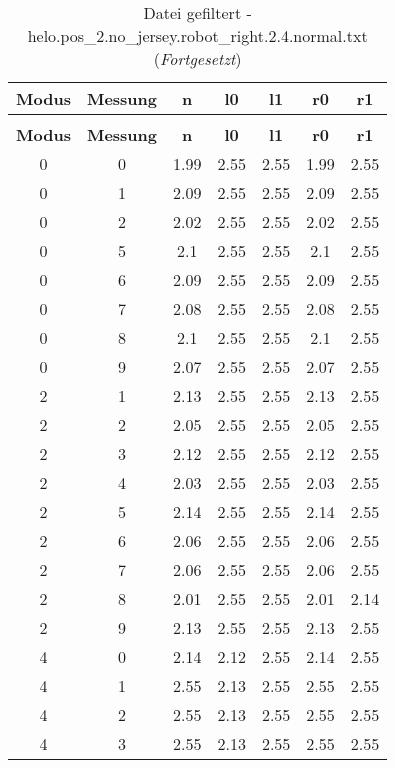 \begin{longtable}{|c|c||c||c|c||c|c|}
	\caption{Datei gefiltert - helo.pos\_2.no\_jersey.robot\_right.2.4.normal.txt} \label{tab:helo.pos-2.no-jersey.robot-right.2.4.normal.txt} \\ \hline
	\textbf{Modus} & \textbf{Messung} & \textbf{n} & \textbf{l0} & \textbf{l1} & \textbf{r0} & \textbf{r1}\\ \hline
	\endfirsthead
	\caption[]{Datei gefiltert - helo.pos\_2.no\_jersey.robot\_right.2.4.normal.txt (\emph{Fortgesetzt})} \\ \hline
	\textbf{Modus} & \textbf{Messung} & \textbf{n} & \textbf{l0} & \textbf{l1} & \textbf{r0} & \textbf{r1}\\ \hline
	\endhead
	0 & 0 & 1.99 & 2.55 & 2.55 & 1.99 & 2.55 \\ \hline
	0 & 1 & 2.09 & 2.55 & 2.55 & 2.09 & 2.55 \\ \hline
	0 & 2 & 2.02 & 2.55 & 2.55 & 2.02 & 2.55 \\ \hline
	0 & 5 & 2.1 & 2.55 & 2.55 & 2.1 & 2.55 \\ \hline
	0 & 6 & 2.09 & 2.55 & 2.55 & 2.09 & 2.55 \\ \hline
	0 & 7 & 2.08 & 2.55 & 2.55 & 2.08 & 2.55 \\ \hline
	0 & 8 & 2.1 & 2.55 & 2.55 & 2.1 & 2.55 \\ \hline
	0 & 9 & 2.07 & 2.55 & 2.55 & 2.07 & 2.55 \\ \hline
	2 & 1 & 2.13 & 2.55 & 2.55 & 2.13 & 2.55 \\ \hline
	2 & 2 & 2.05 & 2.55 & 2.55 & 2.05 & 2.55 \\ \hline
	2 & 3 & 2.12 & 2.55 & 2.55 & 2.12 & 2.55 \\ \hline
	2 & 4 & 2.03 & 2.55 & 2.55 & 2.03 & 2.55 \\ \hline
	2 & 5 & 2.14 & 2.55 & 2.55 & 2.14 & 2.55 \\ \hline
	2 & 6 & 2.06 & 2.55 & 2.55 & 2.06 & 2.55 \\ \hline
	2 & 7 & 2.06 & 2.55 & 2.55 & 2.06 & 2.55 \\ \hline
	2 & 8 & 2.01 & 2.55 & 2.55 & 2.01 & 2.14 \\ \hline
	2 & 9 & 2.13 & 2.55 & 2.55 & 2.13 & 2.55 \\ \hline
	4 & 0 & 2.14 & 2.12 & 2.55 & 2.14 & 2.55 \\ \hline
	4 & 1 & 2.55 & 2.13 & 2.55 & 2.55 & 2.55 \\ \hline
	4 & 2 & 2.55 & 2.13 & 2.55 & 2.55 & 2.55 \\ \hline
	4 & 3 & 2.55 & 2.13 & 2.55 & 2.55 & 2.55 \\ \hline

\end{longtable}
